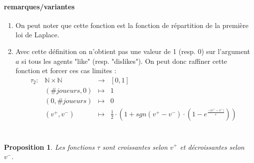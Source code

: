 \documentclass[12pt]{article}
\newtheorem{proposition}{Proposition}[section]
\theoremstyle{defi}
\theoremstyle{not}
\theoremstyle{prob}
\begin{document}
      \paragraph{remarques/variantes}
      \label{ref:rem_def_tau}
        \begin{enumerate}
          \item On peut noter que cette fonction est la fonction de répartition de la première loi de Laplace.
          \item Avec cette définition on n'obtient pas une valeur de 1 (resp. $0$) sur l'argument $a$ si tous les agents "like" (resp. "dislikes"). On peut donc raffiner cette fonction et forcer ces cas limites :
            $$
              \begin{array}{rclc}
                \tau_2 :  & \mathbb{N} \times \mathbb{N} & \longrightarrow & [0, 1] \\
                & (\#joueurs, 0) & \longmapsto & 1 \\
                & (0, \#joueurs) & \longmapsto & 0 \\
                & (v^+,v^-) & \longmapsto & \frac{1}{2} \cdot \left(1 + sgn(v^+ - v^-) \cdot \left(1 - e^{\frac{-|v^+ - v^-|}{\varepsilon}}\right)\right)\\
              \end{array}
            $$\\
        \end{enumerate}
\color{blue}
      \begin{proposition}
        Les fonctions $\tau$ sont croissantes selon $v^+$ et décroissantes selon $v^-$.
      \end{proposition}
\end{document}
